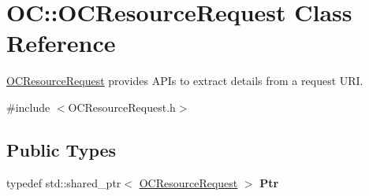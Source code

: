\hypertarget{classOC_1_1OCResourceRequest}{}\section{O\+C\+:\+:O\+C\+Resource\+Request Class Reference}
\label{classOC_1_1OCResourceRequest}


\hyperlink{classOC_1_1OCResourceRequest}{O\+C\+Resource\+Request} provides A\+P\+Is to extract details from a request U\+R\+I.  




{\ttfamily \#include $<$O\+C\+Resource\+Request.\+h$>$}

\subsection*{Public Types}
\begin{DoxyCompactItemize}
\item 
\hypertarget{classOC_1_1OCResourceRequest_a9915455a27d7caba6b3f2bddae6b8ea8}{}typedef std\+::shared\+\_\+ptr$<$ \hyperlink{classOC_1_1OCResourceRequest}{O\+C\+Resource\+Request} $>$ {\bfseries Ptr}\label{classOC_1_1OCResourceRequest_a9915455a27d7caba6b3f2bddae6b8ea8}

\end{DoxyCompactItemize}
